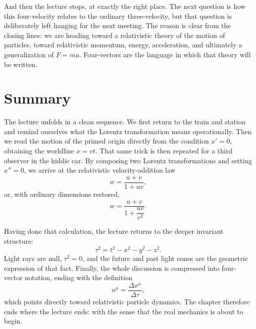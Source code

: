 And then the lecture stops, at exactly the right place. The next question is how this four-velocity relates to the ordinary three-velocity, but that question is deliberately left hanging for the next meeting. The reason is clear from the closing lines: we are heading toward a relativistic theory of the motion of particles, toward relativistic momentum, energy, acceleration, and ultimately a generalization of \(F=ma\). Four-vectors are the language in which that theory will be written.

\section{Summary}

The lecture unfolds in a clean sequence. We first return to the train and station and remind ourselves what the Lorentz transformation means operationally. Then we read the motion of the primed origin directly from the condition \(x'=0\), obtaining the worldline \(x=vt\). That same trick is then repeated for a third observer in the kiddie car. By composing two Lorentz transformations and setting \(x''=0\), we arrive at the relativistic velocity-addition law
\begin{equation}
w=\frac{u+v}{1+uv},
\end{equation}
or, with ordinary dimensions restored,
\begin{equation}
w=\frac{u+v}{1+\dfrac{uv}{c^2}}.
\end{equation}

Having done that calculation, the lecture returns to the deeper invariant structure:
\begin{equation}
\tau^2=t^2-x^2-y^2-z^2.
\end{equation}
Light rays are null, \(\tau^2=0\), and the future and past light cones are the geometric expression of that fact. Finally, the whole discussion is compressed into four-vector notation, ending with the definition
\begin{equation}
u^\mu=\frac{\Delta x^\mu}{\Delta\tau},
\end{equation}
which points directly toward relativistic particle dynamics. The chapter therefore ends where the lecture ends: with the sense that the real mechanics is about to begin.
